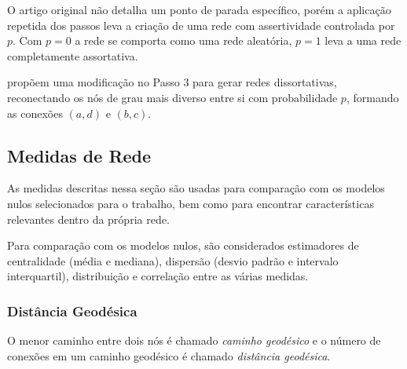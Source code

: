 \documentclass[12pt,a4paper,final]{article}
\begin{document}
O artigo original não detalha um ponto de parada específico, porém a aplicação repetida dos passos leva a criação de uma rede com assertividade controlada por $p$. Com $p = 0$ a rede se comporta como uma rede aleatória, $p = 1$ leva a uma rede completamente assortativa.
 
 propõem uma modificação no Passo 3 para gerar redes dissortativas, reconectando os nós de grau mais diverso entre si com probabilidade $p$, formando as conexões $(a, d)$ e $(b, c)$.


\subsection{Medidas de Rede}

As medidas descritas nessa seção são usadas para comparação com os modelos nulos selecionados para o trabalho, bem como para encontrar características relevantes dentro da própria rede.

Para comparação com os modelos nulos, são considerados estimadores de centralidade (média e mediana), dispersão (desvio padrão e intervalo interquartil), distribuição e correlação entre as várias medidas.

\subsubsection{Distância Geodésica} \label{sec:distancia-geodesica}

O menor caminho entre dois nós é chamado \textit{caminho geodésico} e o número de conexões em um caminho geodésico é chamado \textit{distância geodésica}.
\end{document}
